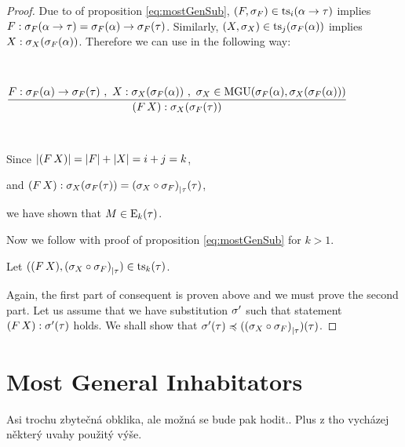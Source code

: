 \documentclass[a4paper,oneside]{memoir}
\begin{document}
\begin{proposition}
\begin{proof}
Due to \IH of proposition \ref{eq:mostGenSub}, 
$(F,\sigma_{F}) \in \operatorname{ts}_{i}(\alpha \rightarrow \tau)$ implies $F : \sigma_{F}(\alpha \rightarrow \tau) = \sigma_{F}(\alpha) \rightarrow \sigma_{F}(\tau)$.
Similarly, $(X,\sigma_{X}) \in \operatorname{ts}_{j}(\sigma_{F}(\alpha))$ implies $X : \sigma_{X}(\sigma_{F}(\alpha))$.
Therefore we can use \mguMp in the following way:

~

$\dfrac{F : \sigma_{F}(\alpha) \rightarrow \sigma_{F}(\tau)\ ,\ X : \sigma_{X}(\sigma_{F}(\alpha))\ , \ \sigma_{X} \in \operatorname{MGU}(\sigma_{F}(\alpha),\sigma_{X}(\sigma_{F}(\alpha)))}{(F\,X) : \sigma_{X}(\sigma_{F}(\tau))}$

~


Since $\lvert (F\,X) \rvert = \lvert F \rvert + \lvert X \rvert = i + j = k$, 

and $(F\,X) : \sigma_{X}(\sigma_{F}(\tau)) = {(\sigma_{X} \circ \sigma_{F})}_{\mid \tau}(\tau)$,

we have shown that $M \in \operatorname{E}_{k}(\tau)$.

Now we follow with proof of proposition \ref{eq:mostGenSub} for $k > 1$.

Let $((F\,X),{(\sigma_{X} \circ \sigma_{F})}_{\mid \tau}) \in \operatorname{ts}_{k}(\tau)$.

Again, the first part of consequent is proven above and we must prove the second part.
Let us assume that we have substitution $\sigma^\prime$ such that 
statement $(F\,X) : \sigma^\prime(\tau)$ holds. We shall show that $\sigma^\prime(\tau) \preccurlyeq ({(\sigma_{X} \circ \sigma_{F})}_{\mid \tau})(\tau)$.








\end{proof}

\end{proposition}



\section{Most General Inhabitators}

Asi trochu zbytečná obklika, ale možná se bude pak hodit.. Plus z tho vycházej některý uvahy použitý výše.
\end{document}

